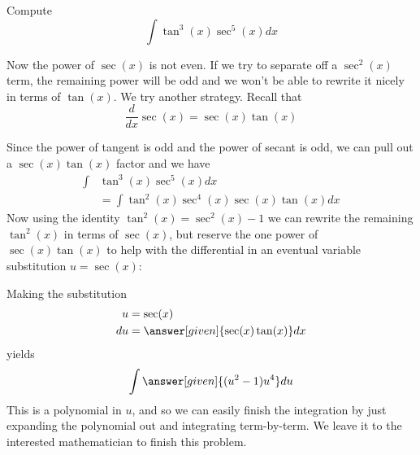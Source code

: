 \documentclass{ximera}
\begin{document}
\begin{example}
  Compute
  \[
  \int \tan^3(x) \sec^5(x) dx
  \]
  \begin{explanation}
    Now the power of $\sec(x)$ is not even. If we try to separate off a $\sec^{2}(x)$ term, the remaining power 
will be odd and we won't be able to rewrite it nicely in terms of $\tan(x)$.
    We try another strategy. Recall that
\[
\frac{d}{dx} \sec(x)=\sec(x) \tan(x)
\] 
   
   
    Since the power of tangent is odd and the power of secant is odd,
    we can pull out a $\sec(x)\tan(x)$ factor and we have
    \begin{align*}
    \int &\tan^3(x) \sec^5(x) dx \\
    &= \int\tan^2(x) \sec^4(x) \sec(x)\tan(x) dx
    \end{align*}
    Now using the identity $\tan^{2}(x)=\sec^{2}(x)-1$ we can rewrite the remaining $\tan^{2}(x)$ in
    terms of $\sec(x)$, but reserve the one power of $\sec(x)\tan(x)$ to help
    with the differential in an eventual variable substitution $u=\sec(x)$:
    \begin{center}%
    \end{center}
    Making the substitution
    \begin{align*}
      u &= \sec(x)\\
      du &=\answer[given]{\sec(x)\tan(x)} dx
    \end{align*}
    yields
    \[
    \int \answer[given]{(u^2-1)u^4} du
    \]
    This is a polynomial in $u$, and so we can easily finish the
    integration by just expanding the polynomial out and integrating
    term-by-term. We leave it to the interested mathematician to
    finish this problem.
  \end{explanation}
\end{example}

%
%
%
%
%
%
%
%
%
%
%
\end{document}
